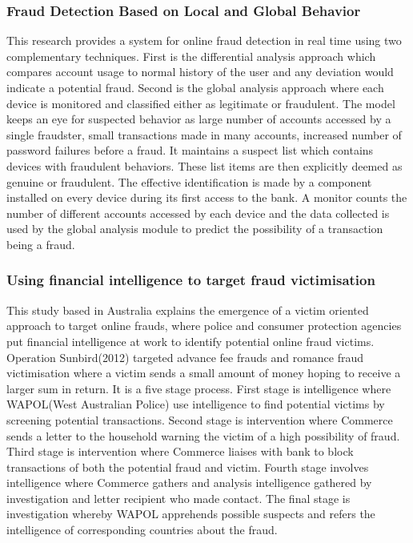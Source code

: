 \documentclass[12pt, oneside, a4paper]{article}
\begin{document}
\subsubsection{Fraud Detection Based on Local and Global Behavior}
This research\cite{PrevailingMethods3} provides a system for online fraud detection in real time using two complementary techniques. First is the differential analysis approach which compares account usage to normal history of the user and any deviation would indicate a potential fraud. Second is the global analysis approach where each device is monitored and classified either as legitimate or fraudulent. The model keeps an eye for suspected behavior as large number of accounts accessed by a single fraudster, small transactions made in many accounts, increased number of password failures before a fraud. It maintains a suspect list which contains devices with fraudulent behaviors. These list items are then explicitly deemed as genuine or fraudulent. The effective identification is made by a component installed on every device during its first access to the bank. A monitor counts the number of different accounts accessed by each device and the data collected is used by the global analysis module to predict the possibility of a transaction being a fraud.

\subsubsection{Using financial intelligence to target fraud victimisation}
This study\cite{PrevailingMethods4} based in Australia explains the emergence of a victim oriented approach to target online frauds, where police and consumer protection agencies put financial intelligence at work to identify potential online fraud victims. Operation Sunbird(2012) targeted advance fee frauds and romance fraud victimisation where a victim sends a small amount of money hoping to receive a larger sum in return. It is a five stage process. First stage is intelligence where WAPOL(West Australian Police) use intelligence to find potential victims by screening potential transactions. Second stage is intervention where Commerce sends a letter to the household warning the victim of a high possibility of fraud. Third stage is intervention where Commerce liaises with bank to block transactions of both the potential fraud and victim. Fourth stage involves intelligence where Commerce gathers and analysis intelligence gathered by investigation and letter recipient who made contact. The final stage is investigation whereby WAPOL apprehends possible suspects and refers the intelligence of corresponding countries about the fraud.
\end{document}
